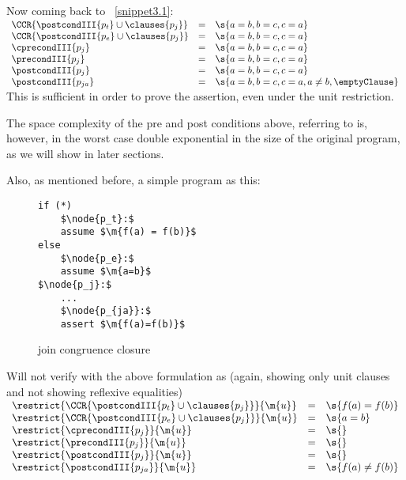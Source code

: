 Now coming back to ~\ref{snippet3.1}:\\
$
\begin{array}{lllll}
\CCR{\postcondIII{p_t} \cup \clauses{p_j}}  & = & \s{a=b,b=c,c=a} \\
\CCR{\postcondIII{p_e} \cup \clauses{p_j}}  & = & \s{a=b,b=c,c=a} \\
\cprecondIII{p_j}                          & = & \s{a=b,b=c,c=a} \\
\precondIII{p_j}                           & = & \s{a=b,b=c,c=a} \\
\postcondIII{p_j}                          & = & \s{a=b,b=c,c=a} \\
\postcondIII{p_{ja}}                       & = & \s{a=b,b=c,c=a,a \neq b,\emptyClause} \\
\end{array}
$\\
This is sufficient in order to prove the assertion, even under the unit restriction.

The space complexity of the pre and post conditions above, referring to  is, however, in the worst case double exponential in the size of the original program, as we will show in later sections.

Also, as mentioned before, a simple program as this:
\begin{figure}[H]
\begin{lstlisting}
if (*)
	$\node{p_t}:$
	assume $\m{f(a) = f(b)}$
else	
	$\node{p_e}:$
	assume $\m{a=b}$
$\node{p_j}:$
	...
	$\node{p_{ja}}:$
	assert $\m{f(a)=f(b)}$
\end{lstlisting}
\caption{join congruence closure}
\label{snippet3.3}
\end{figure}

Will not verify with the above formulation as (again, showing only unit clauses and not showing reflexive equalities)\\
$
\begin{array}{lllll}
\restrict{\CCR{\postcondIII{p_t} \cup \clauses{p_j}}}{\m{u}}  & = & \s{f(a)=f(b)} \\
\restrict{\CCR{\postcondIII{p_e} \cup \clauses{p_j}}}{\m{u}}  & = & \s{a=b} \\
\restrict{\cprecondIII{p_j}}{\m{u}}                          & = & \s{} \\
\restrict{\precondIII{p_j}}{\m{u}}                           & = & \s{} \\
\restrict{\postcondIII{p_j}}{\m{u}}                          & = & \s{} \\
\restrict{\postcondIII{p_{ja}}}{\m{u}}                       & = & \s{f(a) \neq f(b)} \\
\end{array}
$

